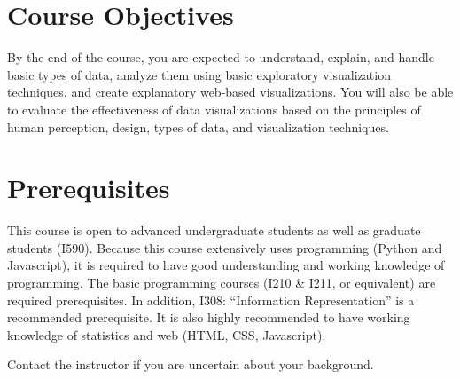 \documentclass[11pt,article,oneside]{memoir}
\begin{document}
\section{Course Objectives}

By the end of the course, you are expected to understand, explain, and handle
basic types of data, analyze them using basic exploratory visualization
techniques, and create explanatory web-based visualizations. You will also be
able to evaluate the effectiveness of data visualizations based on the
principles of human perception, design, types of data, and visualization
techniques. 
 



\section{Prerequisites}
\label{sec:Prerequisites}

This course is open to advanced undergraduate students as well as graduate
students (I590). Because this course extensively uses programming (Python and
Javascript), it is required to have good understanding and working knowledge of
programming. The basic programming courses (I210 \& I211, or equivalent) are
required prerequisites. In addition, I308: ``Information Representation'' is a
recommended prerequisite. It is also highly recommended to have working
knowledge of statistics and web (HTML, CSS, Javascript). 


Contact the instructor if you are uncertain about your background. 
\end{document}
